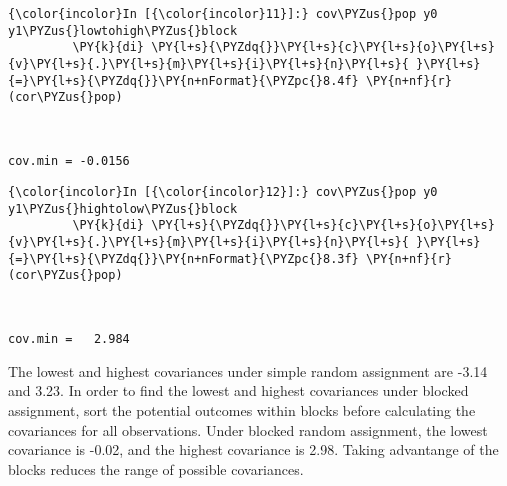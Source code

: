 \documentclass[11pt,notitlepage]{article}\usepackage[]{graphicx}\usepackage[]{color}
\makeatletter
\newenvironment{kframe}{%
 \def\at@end@of@kframe{}%
 \ifinner\ifhmode%
  \def\at@end@of@kframe{\end{minipage}}%
  \begin{minipage}{\columnwidth}%
 \fi\fi%
 \def\FrameCommand##1{\hskip\@totalleftmargin \hskip-\fboxsep
 \colorbox{shadecolor}{##1}\hskip-\fboxsep
     \hskip-\linewidth \hskip-\@totalleftmargin \hskip\columnwidth}%
 \MakeFramed {\advance\hsize-\width
   \@totalleftmargin\z@ \linewidth\hsize
   \@setminipage}}%
 {\par\unskip\endMakeFramed%
 \at@end@of@kframe}
\newenvironment{knitrout}{}{} %
\makeatother
\begin{document}
\begin{knitrout}
\begin{kframe}
    \begin{Verbatim}[commandchars=\\\{\}]
{\color{incolor}In [{\color{incolor}11}]:} cov\PYZus{}pop y0 y1\PYZus{}lowtohigh\PYZus{}block
         \PY{k}{di} \PY{l+s}{\PYZdq{}}\PY{l+s}{c}\PY{l+s}{o}\PY{l+s}{v}\PY{l+s}{.}\PY{l+s}{m}\PY{l+s}{i}\PY{l+s}{n}\PY{l+s}{ }\PY{l+s}{=}\PY{l+s}{\PYZdq{}}\PY{n+nFormat}{\PYZpc{}8.4f} \PY{n+nf}{r}(cor\PYZus{}pop)
\end{Verbatim}

    \begin{Verbatim}[commandchars=\\\{\}]


cov.min = -0.0156

    \end{Verbatim}

    \begin{Verbatim}[commandchars=\\\{\}]
{\color{incolor}In [{\color{incolor}12}]:} cov\PYZus{}pop y0 y1\PYZus{}hightolow\PYZus{}block
         \PY{k}{di} \PY{l+s}{\PYZdq{}}\PY{l+s}{c}\PY{l+s}{o}\PY{l+s}{v}\PY{l+s}{.}\PY{l+s}{m}\PY{l+s}{i}\PY{l+s}{n}\PY{l+s}{ }\PY{l+s}{=}\PY{l+s}{\PYZdq{}}\PY{n+nFormat}{\PYZpc{}8.3f} \PY{n+nf}{r}(cor\PYZus{}pop)
\end{Verbatim}

    \begin{Verbatim}[commandchars=\\\{\}]


cov.min =   2.984

    \end{Verbatim}
\end{kframe}
\end{knitrout}

The lowest and highest covariances under simple random assignment are -3.14 and 3.23.  In order to find the lowest and highest covariances under blocked assignment, sort the potential outcomes within blocks before calculating the covariances for all observations.  Under blocked random assignment, the lowest covariance is -0.02, and the highest covariance is 2.98. Taking advantange of the blocks reduces the range of possible covariances.
\end{document}
